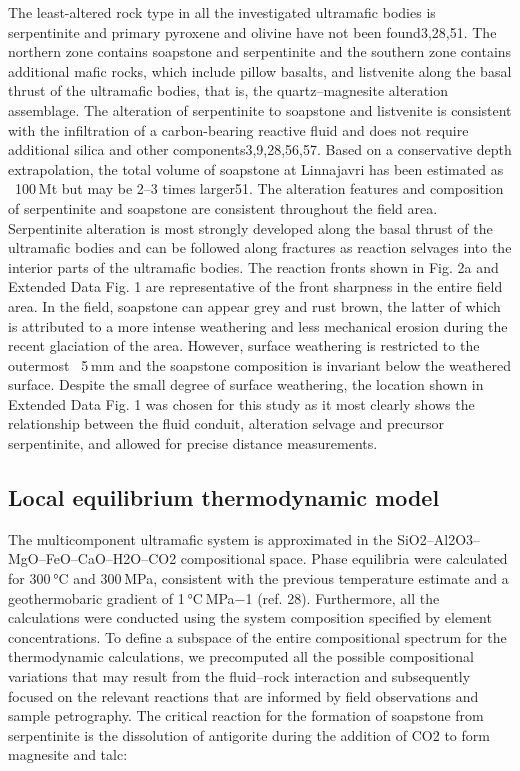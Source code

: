 The least-altered rock type in all the investigated ultramafic bodies is serpentinite and primary pyroxene and olivine have not been found3,28,51. The northern zone contains soapstone and serpentinite and the southern zone contains additional mafic rocks, which include pillow basalts, and listvenite along the basal thrust of the ultramafic bodies, that is, the quartz–magnesite alteration assemblage. The alteration of serpentinite to soapstone and listvenite is consistent with the infiltration of a carbon-bearing reactive fluid and does not require additional silica and other components3,9,28,56,57. Based on a conservative depth extrapolation, the total volume of soapstone at Linnajavri has been estimated as ~100 Mt but may be 2–3 times larger51. The alteration features and composition of serpentinite and soapstone are consistent throughout the field area. Serpentinite alteration is most strongly developed along the basal thrust of the ultramafic bodies and can be followed along fractures as reaction selvages into the interior parts of the ultramafic bodies. The reaction fronts shown in Fig. 2a and Extended Data Fig. 1 are representative of the front sharpness in the entire field area. In the field, soapstone can appear grey and rust brown, the latter of which is attributed to a more intense weathering and less mechanical erosion during the recent glaciation of the area. However, surface weathering is restricted to the outermost ~5 mm and the soapstone composition is invariant below the weathered surface. Despite the small degree of surface weathering, the location shown in Extended Data Fig. 1 was chosen for this study as it most clearly shows the relationship between the fluid conduit, alteration selvage and precursor serpentinite, and allowed for precise distance measurements.

\subsection*{Local equilibrium thermodynamic model}
The multicomponent ultramafic system is approximated in the SiO2–Al2O3–MgO–FeO–CaO–H2O–CO2 compositional space. Phase equilibria were calculated for 300 °C and 300 MPa, consistent with the previous temperature estimate and a geothermobaric gradient of 1 °C MPa−1 (ref. 28). Furthermore, all the calculations were conducted using the system composition specified by element concentrations. To define a subspace of the entire compositional spectrum for the thermodynamic calculations, we precomputed all the possible compositional variations that may result from the fluid–rock interaction and subsequently focused on the relevant reactions that are informed by field observations and sample petrography. The critical reaction for the formation of soapstone from serpentinite is the dissolution of antigorite during the addition of CO2 to form magnesite and talc:

